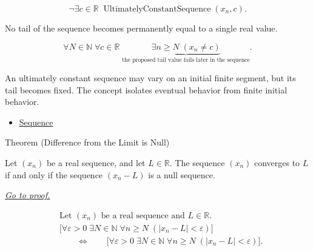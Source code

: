 \begin{remark*}
\[
\neg\exists c \in \mathbb{R}\;
\operatorname{UltimatelyConstantSequence}(x_n,c).
\]
\end{remark*}

\begin{remark*}
No tail of the sequence becomes permanently equal to a single real value.
\end{remark*}

\begin{remark*}
\[
\forall N \in \mathbb{N}\;
\forall c \in \mathbb{R}\;
\underbrace{\exists n \ge N\;(x_n \neq c)}
_{\text{the proposed tail value fails later in the sequence}}.
\]
\end{remark*}

\begin{remark*}[Interpretation]
An ultimately constant sequence may vary on an initial finite segment, but its
tail becomes fixed. The concept isolates eventual behavior from finite
initial behavior.
\end{remark*}

\begin{dependencies}
\begin{itemize}
  \item \hyperref[def:sequence]{Sequence}
\end{itemize}
\end{dependencies}


\begin{theorembox}{Theorem (Difference from the Limit is Null)}
\begin{theorem}
\label{thm:difference-from-limit-is-null}
Let $(x_n)$ be a real sequence, and let $L \in \mathbb{R}$. The sequence
$(x_n)$ converges to $L$ if and only if the sequence $(x_n - L)$ is a null
sequence.

\smallskip
\noindent
\hyperref[prf:difference-from-limit-is-null]{\textit{Go to proof.}}
\end{theorem}
\end{theorembox}

\begin{remark*}
\[
\begin{aligned}
&\text{Let } (x_n) \text{ be a real sequence and } L \in \mathbb{R}.\\
&\bigl[
\forall \varepsilon > 0\;
\exists N \in \mathbb{N}\;
\forall n \ge N\;(|x_n - L| < \varepsilon)
\bigr]\\
&\qquad\Longleftrightarrow\qquad
\bigl[
\forall \varepsilon > 0\;
\exists N \in \mathbb{N}\;
\forall n \ge N\;(|x_n - L| < \varepsilon)
\bigr].
\end{aligned}
\]
\end{remark*}


